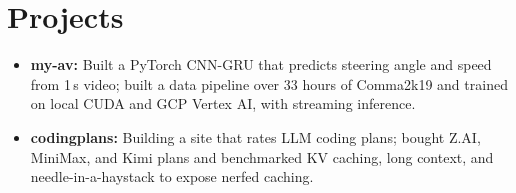 \documentclass[11pt, letterpaper]{article}
\begin{document}
\section{Projects}
\begin{itemize}
  \item \textbf{my-av:} Built a PyTorch CNN-GRU that predicts steering angle and speed from 1\,s video; built a data pipeline over 33 hours of Comma2k19 and trained on local CUDA and GCP Vertex AI, with streaming inference.
  \item \textbf{codingplans:} Building a site that rates LLM coding plans; bought Z.AI, MiniMax, and Kimi plans and benchmarked KV caching, long context, and needle-in-a-haystack to expose nerfed caching.
\end{itemize}
\end{document}
